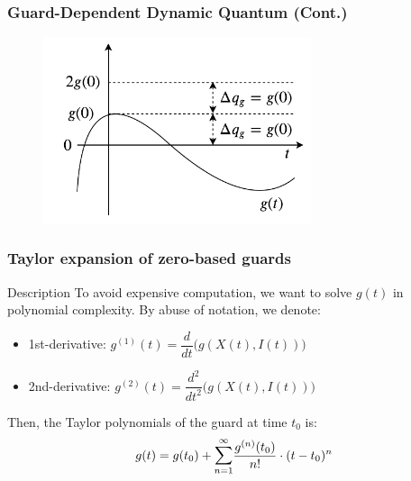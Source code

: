 \begin{frame}[c] \frametitle{ Guard-Dependent Dynamic Quantum (Cont.) }
	\begin{figure}
		\includegraphics[width=0.7\textwidth]{./fig/diagrams/deltaq.pdf}
	\end{figure}
\end{frame}

\begin{frame}[c] \frametitle{ Taylor expansion of zero-based guards }
	\begin{block}{Description}
		To avoid expensive computation, we want to solve $g(t)$ in polynomial complexity. By abuse of notation, we denote:
		\begin{itemize}
			\item 1st-derivative: $g^{(1)}(t) = \dfrac{d}{dt} \big( g(X(t), I(t)) \big)$
			\item 2nd-derivative: $g^{(2)}(t) = \dfrac{d^2}{dt^2} \big( g(X(t), I(t)) \big)$
		\end{itemize}
		Then, the Taylor polynomials of the guard at time $t_0$ is:
		\begin{equation}
			g(t) = g(t_0) + \mathlarger{\sum}_{n=1}^{\infty} \dfrac{g^{(n)}(t_0)}{n!} \cdot (t - t_0)^n
		\end{equation}
	\end{block}
\end{frame}

